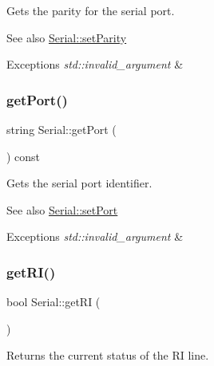 Gets the parity for the serial port.

\begin{DoxySeeAlso}{See also}
\mbox{\hyperlink{classserial_1_1_serial_a1e1896aa59ec35ac5bd263b87614ef01}{Serial\+::set\+Parity}}
\end{DoxySeeAlso}

\begin{DoxyExceptions}{Exceptions}
{\em std\+::invalid\+\_\+argument} & \\
\hline
\end{DoxyExceptions}
\mbox{\label{classserial_1_1_serial_a50ceb4a9d3fe2d6e9a21ba83a3222a9b}} 
\subsubsection{\texorpdfstring{get\+Port()}{getPort()}}
{\footnotesize\ttfamily string Serial\+::get\+Port (\begin{DoxyParamCaption}{ }\end{DoxyParamCaption}) const}

Gets the serial port identifier.

\begin{DoxySeeAlso}{See also}
\mbox{\hyperlink{classserial_1_1_serial_acecb0a5102ae0c944fe4b78e4adf839a}{Serial\+::set\+Port}}
\end{DoxySeeAlso}

\begin{DoxyExceptions}{Exceptions}
{\em std\+::invalid\+\_\+argument} & \\
\hline
\end{DoxyExceptions}
\mbox{\label{classserial_1_1_serial_afb96e6968f040c4bff7576095f4ba6e7}} 
\subsubsection{\texorpdfstring{get\+R\+I()}{getRI()}}
{\footnotesize\ttfamily bool Serial\+::get\+RI (\begin{DoxyParamCaption}{ }\end{DoxyParamCaption})}

Returns the current status of the RI line. \mbox{\label{classserial_1_1_serial_a2bf619bd500f12fe973244f4c16e430a}} 
